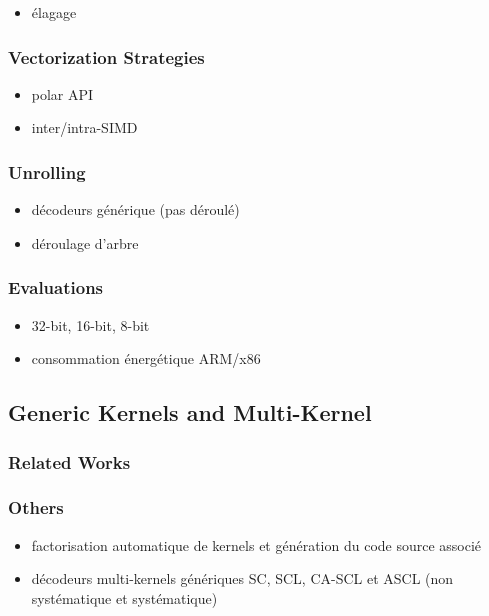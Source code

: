 \begin{itemize}
  \item élagage
\end{itemize}

\subsubsection{Vectorization Strategies}

\begin{itemize}
  \item polar API
  \item inter/intra-SIMD
\end{itemize}

\subsubsection{Unrolling}

\begin{itemize}
  \item décodeurs générique (pas déroulé)
  \item déroulage d'arbre
\end{itemize}

\subsubsection{Evaluations}

\begin{itemize}
  \item 32-bit, 16-bit, 8-bit
  \item consommation énergétique ARM/x86
\end{itemize}

\subsection{Generic Kernels and Multi-Kernel}

\subsubsection{Related Works}

\subsubsection{Others}

\begin{itemize}
  \item factorisation automatique de kernels et génération du code source associé
  \item décodeurs multi-kernels génériques SC, SCL, CA-SCL et ASCL (non systématique et systématique)
\end{itemize}

